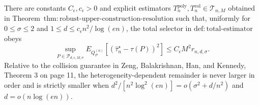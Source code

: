 There are constants \(C_{\epsilon},c_{\epsilon}>0\) and explicit estimators \(T_n^{\mathrm{poly}},T_n^{\mathrm{col}}\in\mathcal T_{n,M}\) obtained in Theorem~\(\mathrm{thm:robust\text{-}upper\text{-}construction\text{-}resolution}\) such that, uniformly for \(0\le\sigma\le2\) and \(1\le d\le c_{\epsilon}n^2/\log(en)\), the total selector in \(\mathrm{def:total\text{-}estimator}\) obeys \[\sup_{P\in\mathcal P_{d,\epsilon,M,\sigma}}E_{Q_P^{(n)}}[(\widehat\tau_n^{\star}-\tau(P))^2]\le C_{\epsilon}M^2r_{n,d,\sigma}.\] Relative to the collision guarantee in Zeng, Balakrishnan, Han, and Kennedy, Theorem 3 on page 11, the heterogeneity-dependent remainder is never larger in order and is strictly smaller when \(d^2/[n^2\log^2(en)]=o(\sigma^2+d/n^2)\) and \(d=o(n\log(en))\).